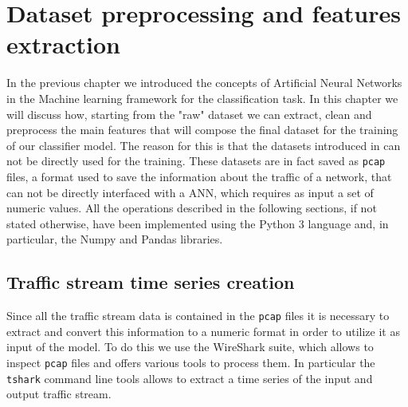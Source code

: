 \chapter{Dataset preprocessing and features extraction}\label{chap4}

In the previous chapter we introduced the concepts of Artificial Neural Networks in the Machine learning framework for the classification task. In this chapter we will discuss how, starting from the "raw" dataset we can extract, clean and preprocess the main features that will compose the final dataset for the training of our classifier model.
The reason for this is that the datasets introduced in  can not be  directly used for the training. These datasets are in fact saved as \texttt{pcap} files, a format used to save the information about the traffic of a network, that can not be directly interfaced with a ANN, which requires as input a set of numeric values. 
All the operations described in the following sections, if not stated otherwise, have been implemented using the Python 3 language\cite{python} and, in particular, the Numpy and Pandas libraries\cite{numpy,pandas}. 

\section{Traffic stream time series creation}

Since all the traffic stream data is contained in the \texttt{pcap} files it is necessary to extract and convert this information to a numeric format in order to utilize it as input of the model.
To do this we use the WireShark suite\cite{wireshark}, which allows to inspect \texttt{pcap} files and offers various tools to process them. In particular the \texttt{tshark} command line tools allows to extract a time series of the input and output traffic stream.


